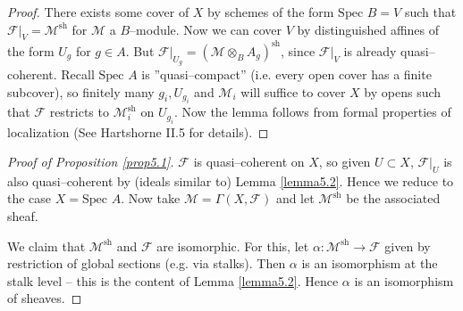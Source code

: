 \documentclass{article}
\theoremstyle{definition}
\begin{document}
\begin{proof}
    There exists some cover of $X$ by schemes of the form $\text{Spec }B = V$ such that $\mathcal{F}|_V = \mathcal{M}^{\text{sh}}$ for $\mathcal{M}$ a $B$--module. Now we can cover $V$ by distinguished affines of the form $U_g$ for $g \in A$. But $\mathcal{F}|_{U_g} = (\mathcal{M} \otimes_B A_g)^{\text{sh}}$, since $\mathcal{F}|_V$ is already quasi--coherent. Recall $\text{Spec }A$ is ''quasi--compact'' (i.e. every open cover has a finite subcover), so finitely many $g_i, U_{g_i}$ and $\mathcal{M}_i$ will suffice to cover $X$ by opens such that $\mathcal{F}$ restricts to $\mathcal{M}_i^{\text{sh}}$ on $U_{g_i}$. Now the lemma follows from formal properties of localization (See Hartshorne II.5 for details).
\end{proof}
\begin{proof}[Proof of Proposition \ref{prop5.1}]
    $\mathcal{F}$ is quasi--coherent on $X$, so given $U \subset X$, $\mathcal{F}|_U$ is also quasi--coherent by (ideals similar to) Lemma \ref{lemma5.2}. Hence we reduce to the case $X = \text{Spec }A$. Now take $\mathcal{M}= \Gamma(X,\mathcal{F})$ and let $\mathcal{M}^{\text{sh}}$ be the associated sheaf.
    \vspace{1mm}
     
    We claim that $\mathcal{M}^{\text{sh}}$ and $\mathcal{F}$ are isomorphic. For this, let $\alpha : \mathcal{M}^{\text{sh}} \to\mathcal{F}$ given by restriction of global sections (e.g. via stalks). Then $\alpha$ is an isomorphism at the stalk level -- this is the content of Lemma \ref{lemma5.2}. Hence $\alpha$ is an isomorphism of sheaves.
\end{proof}
\end{document}
